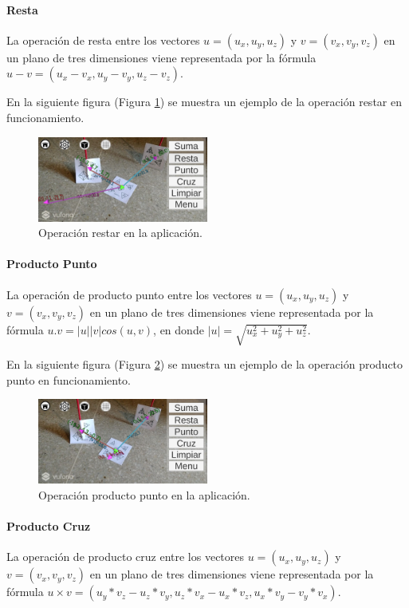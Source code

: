 \paragraph{Resta}
La operación de resta entre los vectores $u=(u_x,u_y,u_z)$ y $v=(v_x,v_y,v_z)$ en un plano de tres dimensiones viene representada por la fórmula $u - v = (u_x-v_x, u_y-v_y, u_z-v_z)$.

En la siguiente figura (Figura \ref{fig:vec_resta}) se muestra un ejemplo de la operación restar en funcionamiento.

\begin{figure}[hbt!]
\centering
\includegraphics[width=0.5\textwidth]{figuras/vectores/Resta.png}
\caption{\label{fig:vec_resta}Operación restar en la aplicación.}
\end{figure}
\FloatBarrier

\paragraph{Producto Punto}
La operación de producto punto entre los vectores $u=(u_x,u_y,u_z)$ y $v=(v_x,v_y,v_z)$ en un plano de tres dimensiones viene representada por la fórmula $u . v = | u | | v | cos(u,v)$, en donde $| u | = \sqrt{u_x^2 + u_y^2 + u_z^2}$.

En la siguiente figura (Figura \ref{fig:vec_punto}) se muestra un ejemplo de la operación producto punto en funcionamiento.

\begin{figure}[hbt!]
\centering
\includegraphics[width=0.5\textwidth]{figuras/vectores/ProductoPunto.png}
\caption{\label{fig:vec_punto}Operación producto punto en la aplicación.}
\end{figure}
\FloatBarrier

\paragraph{Producto Cruz}
La operación de producto cruz entre los vectores $u=(u_x,u_y,u_z)$ y $v=(v_x,v_y,v_z)$ en un plano de tres dimensiones viene representada por la fórmula $u \times v = (u_y*v_z - u_z*v_y, u_z*v_x - u_x*v_z, u_x*v_y - v_y*v_x)$.


